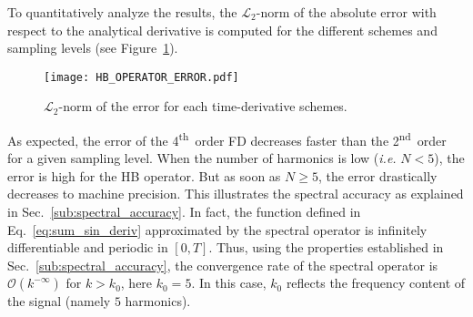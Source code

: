 To quantitatively analyze the results, the 
$\mathcal{L}_2$-norm of the absolute error with respect to the analytical
derivative is computed for the different schemes and 
sampling levels (see Figure~\ref{fig:hb_operator_error}).
\begin{figure}[htp]
  \centering
   \texttt{[image: HB\_OPERATOR\_ERROR.pdf]}
   \caption{$\mathcal{L}_2$-norm of the error for each time-derivative
   schemes.}
  \label{fig:hb_operator_error}
\end{figure}
As expected, the error of the 4\textsuperscript{th}~order FD
decreases faster  than the 2\textsuperscript{nd}~order for a given sampling level.
When the number of harmonics is low 
(\emph{i.e.} $N < 5$), the error is high for the HB operator. 
But as soon as $N \geq 5$, the error
drastically decreases to machine precision.
This illustrates the spectral accuracy as explained in 
Sec.~\ref{sub:spectral_accuracy}. In fact, the function defined
in Eq.~\eqref{eq:sum_sin_deriv} approximated by the spectral operator
is infinitely differentiable and periodic in $[0, T]$.
Thus, using the properties established in Sec.~\ref{sub:spectral_accuracy},
the convergence rate of the spectral operator is $\mathcal{O} (k^{-\infty})$
for $k > k_0$, here $k_0=5$. In this case, $k_0$
reflects the frequency content of the signal (namely $5$ harmonics).
